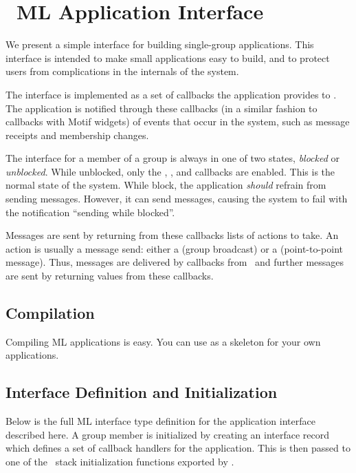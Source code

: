 %
%
%
\section{\ensemble\ ML Application Interface}
\label{section:applintf}

We present a simple interface for building single-group applications.  This
interface is intended to make small applications easy to build, and to protect
users from complications in the internals of the system.

The interface is implemented as a set of callbacks the application
provides to \ensemble.  The application is notified through these
callbacks (in a similar fashion to callbacks with Motif widgets) of
events that occur in the system, such as message receipts and
membership changes.

The interface for a member of a group is always in one of two states,
\emph{blocked} or \emph{unblocked}.  While unblocked, only the
, , and 
callbacks are enabled.  This is the normal state of the system. While
block, the application \emph{should} refrain from sending messages. However,
it can send messages, causing the system to fail with the notification
``sending while blocked''.

Messages are sent by returning from these callbacks lists of actions to
take.  An action is usually a message send: either a  (group
broadcast) or a  (point-to-point message).  Thus, messages are
delivered by callbacks from \ensemble\ and further messages are sent by
returning values from these callbacks.

\subsection{Compilation}
Compiling ML applications is easy.  You can use  as a
skeleton for your own applications.

\subsection{Interface Definition and Initialization}
Below is the full ML interface type definition for the application
interface described here.  A group member is initialized by creating
an interface record which defines a set of callback handlers for the
application.  This is then passed to one of the \ensemble\ stack
initialization functions exported by .

